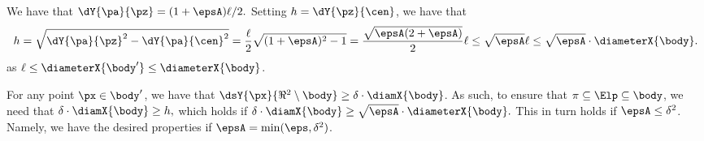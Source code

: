         We have that
        \begin{math}
                \dY{\pa}{\pz} = (1+\epsA)\ell/2.
        \end{math}
        Setting $h = \dY{\pz}{\cen}$, we have that
        \begin{equation*}
                h%
                =%
                \sqrt{\dY{\pa}{\pz}^2 - \dY{\pa}{\cen}^2 }
                =%
                \frac{\ell}{2} \sqrt{(1+\epsA)^2 - 1}
                =%
                \frac{\sqrt{\epsA (2+\epsA)}}{2} \ell%
                \leq
                \sqrt{\epsA} \ell
                \leq
                \sqrt{\epsA}\cdot \diameterX{\body}.
        \end{equation*}
        as $\ell \leq \diameterX{\body'} \leq \diameterX{\body}$.
        
        For any point $\px \in \body'$, we have that
        $\dsY{\px}{\Re^2 \setminus \body} \geq \delta \cdot
        \diamX{\body}$.  As such, to ensure that
        $\pi \subseteq \Elp \subseteq \body$, we need that
        \begin{math}
                \delta \cdot \diamX{\body} \geq h,
        \end{math}
        which holds if
        \begin{math}
                \delta \cdot \diamX{\body} \geq \sqrt{\epsA} \cdot
                \diameterX{\body}.
        \end{math}
        This in turn holds if $\epsA \leq \delta^2$. Namely, we have
        the desired properties if $\epsA = \min( \eps, \delta^2)$.
